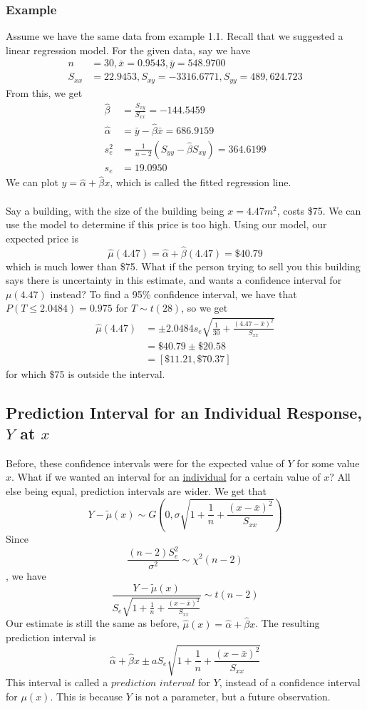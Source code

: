 \documentclass[12pt]{article}
\begin{document}
\subsubsection{Example}
Assume we have the same data from example 1.1. Recall that we suggested a linear regression model. For the given data, say we have
\begin{align*}
    n&=30,\bar x=0.9543,\bar y=548.9700\\
    S_{xx}&=22.9453, S_{xy}=-3316.6771,S_{yy}=489,624.723
\end{align*}
From this, we get
\begin{align*}
    \hat\beta&=\frac{S_{xy}}{S_{xx}}=-144.5459\\
    \hat\alpha &= \bar y-\hat\beta\bar x=686.9159\\
    s^2_e&=\frac{1}{n-2}(S_{yy}-\hat\beta S_{xy})=364.6199\\
    s_e&=19.0950
\end{align*}
We can plot $y=\hat\alpha+\hat\beta x$, which is called the fitted regression line.\\\\
Say a building, with the size of the building being $x=4.47m^2$, costs \$75. We can use the model to determine if this price is too high. Using our model, our expected price is \[\hat\mu (4.47)=\hat\alpha+\hat\beta(4.47)=\$40.79\] which is much lower than \$75. What if the person trying to sell you this building says there is uncertainty in this estimate, and wants a confidence interval for $\mu(4.47)$ instead? To find a 95\% confidence interval, we have that $P(T\leq 2.0484)=0.975$ for $T\sim t(28)$, so we get
\begin{align*}
    \hat\mu(4.47)&=\pm 2.0484s_e\sqrt{\frac{1}{30}+\frac{(4.47-\bar x)^2}{S_{xx}}}\\&=\$40.79\pm\$20.58\\&=[\$11.21,\$70.37]
\end{align*}
for which \$75 is outside the interval.

\subsection{Prediction Interval for an Individual Response, $Y$ at $x$}
Before, these confidence intervals were for the expected value of $Y$ for some value $x$. What if we wanted an interval for an \underline{individual} for a certain value of $x$? All else being equal, prediction intervals are wider. We get that \[Y-\tilde\mu(x)\sim G(0, \sigma\sqrt{1+\frac{1}{n}+\frac{(x-\bar x)^2}{S_{xx}}})\]
Since \[\frac{(n-2)S_e^2}{\sigma^2}\sim \chi^2(n-2)\], we have \[\frac{Y-\tilde\mu(x)}{S_e\sqrt{1+\frac{1}{n}+\frac{(x-\bar x)^2}{S_{xx}}}}\sim t(n-2)\]
Our estimate is still the same as before, $\hat\mu(x)=\hat\alpha+\hat\beta x$. The resulting prediction interval is \[\hat\alpha+\hat\beta x\pm aS_e\sqrt{1+\frac{1}{n}+\frac{(x-\bar x)^2}{S_{xx}}}\]
This interval is called a $prediction$ $interval$ for $Y$, instead of a confidence interval for $\mu(x)$. This is because $Y$ is not a parameter, but a future observation.
\end{document}
